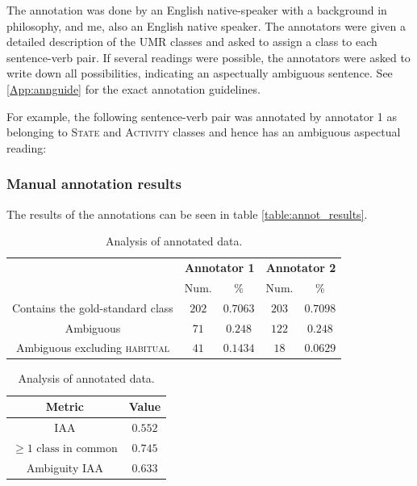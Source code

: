 The annotation was done by an English native-speaker with a background in philosophy, and me, also an English native speaker. The annotators were given a detailed description of the UMR classes and asked to assign a class to each sentence-verb pair. If several readings were possible, the annotators were asked to write down all possibilities, indicating an aspectually ambiguous sentence. See \ref{App:annguide} for the exact annotation guidelines.

For example, the following sentence-verb pair was annotated by annotator 1 as belonging to \textsc{State} and \textsc{Activity} classes and hence has an ambiguous aspectual reading:

\begin{exe}
\end{exe}
\label{ambigExampleSent}

\subsubsection*{Manual annotation results}

The results of the annotations can be seen in table \ref{table:annot_results}.

\begin{table}
    \centering
    \begin{tabular}{|c|c|c|c|c|}\hline
        & \multicolumn{2}{|c|}{\textbf{Annotator 1}} & \multicolumn{2}{|c|}{\textbf{Annotator 2}} \\
        \cline{2-5}
        & Num. & \% & Num. & \%  \\ \hline
        Contains the gold-standard class & $202$ & $0.7063$ & $203$ & $0.7098$ \\ \hline
        Ambiguous & $71$ & $0.248$ & $122$ & $0.248$ \\ \hline
        Ambiguous excluding \textsc{habitual}& $41$ & $0.1434$ & $18$ & $0.0629$ \\ \hline
    \end{tabular}

    \vspace{2em}

    \begin{tabular}{|c|c|}\hline
        \textbf{Metric} & \textbf{Value} \\ \hline
        IAA & $0.552$ \\ \hline
        $\geq 1 \text{ class in common}$ & $0.745$ \\ \hline
        Ambiguity IAA & $0.633$  \\ \hline
    \end{tabular}
    \caption{Analysis of annotated data.}
\end{table}
\label{table:annot_results}


